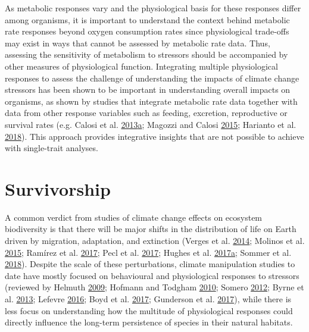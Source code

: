 \documentclass[a4paper,10pt, oneside]{memoir}
\begin{document}
As metabolic responses vary and the physiological basis for these responses differ among organisms, it is important to understand the context behind metabolic rate responses beyond oxygen consumption rates since physiological trade-offs may exist in ways that cannot be assessed by metabolic rate data.
Thus, assessing the sensitivity of metabolism to stressors should be accompanied by other measures of physiological function.
Integrating multiple physiological responses to assess the challenge of understanding the impacts of climate change stressors has been shown to be important in understanding overall impacts on organisms, as shown by studies that integrate metabolic rate data together with data from other response variables such as feeding, excretion, reproductive or survival rates (e.g. Calosi et al. \protect\hyperlink{ref-Calosi2013}{2013}\protect\hyperlink{ref-Calosi2013}{a}; Magozzi and Calosi \protect\hyperlink{ref-Magozzi2015}{2015}; Harianto et al. \protect\hyperlink{ref-Harianto2018}{2018}).
This approach provides integrative insights that are not possible to achieve with single-trait analyses.

\hypertarget{survivorship}{%
\section{Survivorship}\label{survivorship}}

A common verdict from studies of climate change effects on ecosystem biodiversity is that there will be major shifts in the distribution of life on Earth driven by migration, adaptation, and extinction (Verges et al. \protect\hyperlink{ref-Verges2014}{2014}; Molinos et al. \protect\hyperlink{ref-Molinos2015}{2015}; Ramírez et al. \protect\hyperlink{ref-Ramirez2017}{2017}; Pecl et al. \protect\hyperlink{ref-Pecl2017}{2017}; Hughes et al. \protect\hyperlink{ref-Hughes2017}{2017}\protect\hyperlink{ref-Hughes2017}{a}; Sommer et al. \protect\hyperlink{ref-Sommer2018}{2018}).
Despite the scale of these perturbations, climate manipulation studies to date have mostly focused on behavioural and physiological responses to stressors (reviewed by Helmuth \protect\hyperlink{ref-Helmuth2009}{2009}; Hofmann and Todgham \protect\hyperlink{ref-Hofmann2010}{2010}; Somero \protect\hyperlink{ref-Somero2012}{2012}; Byrne et al. \protect\hyperlink{ref-Byrne2013}{2013}; Lefevre \protect\hyperlink{ref-Lefevre2016}{2016}; Boyd et al. \protect\hyperlink{ref-Boyd2017}{2017}; Gunderson et al. \protect\hyperlink{ref-Gunderson2017}{2017}), while there is less focus on understanding how the multitude of physiological responses could directly influence the long-term persistence of species in their natural habitats.
\end{document}
